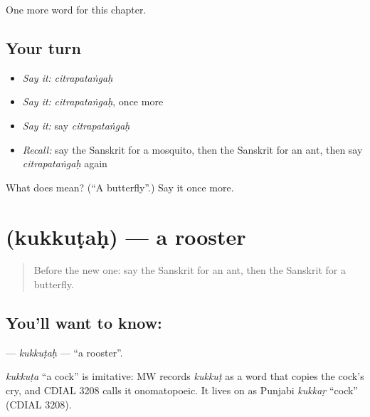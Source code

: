 \begin{grammarlens}[title={What you've built}]
One more word for this chapter.
\end{grammarlens}

\subsection*{Your turn}
\begin{itemize}
\raggedright
  \item \emph{Say it:} \emph{citrapataṅgaḥ}
  \item \emph{Say it:} \emph{citrapataṅgaḥ}, once more
  \item \emph{Say it:} say \emph{citrapataṅgaḥ}
  \item \emph{Recall:} say the Sanskrit for a mosquito, then the Sanskrit for an ant, then say \emph{citrapataṅgaḥ} again
\end{itemize}

\begin{tcolorbox}[breakable,colback=teal!4,colframe=teal!35!black,title={Before you move on}]
What does  mean? (\textquotedblleft{}A butterfly\textquotedblright{}.) Say it once more.
\end{tcolorbox}
\section[\texorpdfstring{\sk{कुक्कुटः} (kukkuṭaḥ)}{कुक्कुटः (kukkuṭaḥ)}]{ (kukkuṭaḥ) — a rooster}

\label{lesson:SA-C115-kukkutah}



\begin{quote}
Before the new one: say the Sanskrit for an ant, then the Sanskrit for a butterfly.
\end{quote}

\subsection*{You'll want to know: }
\textbf{} — \emph{kukkuṭaḥ} — \textquotedblleft{}a rooster\textquotedblright{}.

\begin{cousinweb}
\emph{kukkuṭa} \textquotedblleft{}a cock\textquotedblright{} is imitative: MW records \emph{kukkuṭ} as a word that copies the cock's cry, and CDIAL 3208 calls it onomatopoeic. It lives on as Punjabi \emph{kukkaṛ} \textquotedblleft{}cock\textquotedblright{} (CDIAL 3208).
\end{cousinweb}

